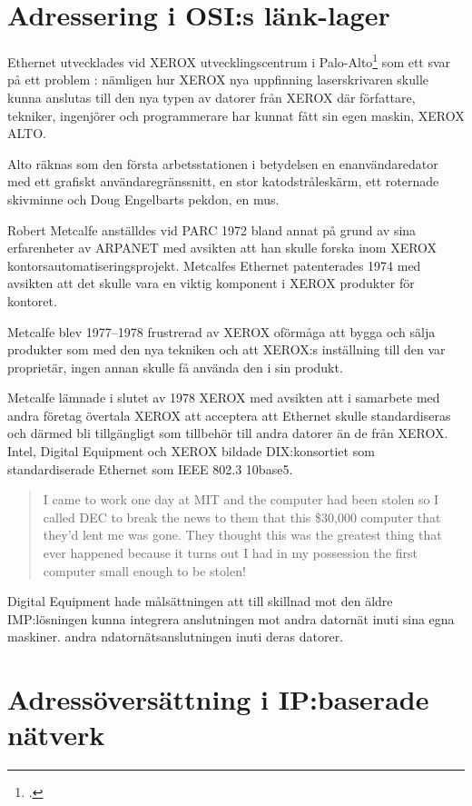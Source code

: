 \documentclass[swedish,10pt,a4paper]{article}
\begin{document}
\section{Adressering i OSI:s länk-lager}\label{sec:adressering_i_osis_data_link_layer}

Ethernet utvecklades vid XEROX utvecklingscentrum i Palo-Alto\footcite[kapitel 1]{Spurgeon2000}
som ett svar på ett problem : nämligen hur XEROX nya uppfinning laserskrivaren
skulle kunna anslutas till den nya typen av datorer från XEROX där författare, tekniker,
ingenjörer och programmerare har kunnat fått sin egen maskin, XEROX ALTO.

Alto räknas som den första arbetsstationen i betydelsen en enanvändaredator med ett grafiskt
användaregränssnitt, en stor katodstråleskärm, ett roternade skivminne
och Doug Engelbarts pekdon, en mus.

Robert Metcalfe anställdes vid PARC 1972 bland annat på grund av sina erfarenheter av ARPANET
med avsikten att han skulle forska inom XEROX kontorsautomatiseringsprojekt.
Metcalfes Ethernet patenterades 1974 med avsikten att det skulle vara en viktig
komponent i XEROX produkter för kontoret.

Metcalfe blev 1977--1978 frustrerad av XEROX oförmåga att bygga och sälja produkter som
med den nya tekniken och att XEROX:s inställning till den var proprietär, ingen
annan skulle få använda den i sin produkt.

Metcalfe lämnade i slutet av 1978 XEROX med avsikten att i samarbete med andra
företag övertala XEROX att acceptera att Ethernet skulle standardiseras
och därmed bli tillgängligt som tillbehör till andra datorer än de från
XEROX. Intel, Digital Equipment och XEROX bildade DIX:konsortiet som
standardiserade Ethernet som IEEE 802.3 10base5.

\blockquote[\cite{Robert Metcalfe}]{I came to work one day at MIT and the computer had
  been stolen so I called DEC to break the news to them that this \$30,000
  computer that they'd lent me was gone. They thought this was the greatest thing that ever
  happened because it turns out I had in my possession the first computer small enough to be stolen!}

Digital Equipment hade målsättningen att till skillnad mot den äldre IMP:lösningen
kunna integrera anslutningen mot andra datornät inuti sina egna maskiner.
andra ndatornätsanslutningen inuti deras datorer.

\section{Adressöversättning i IP:baserade nätverk}\label{sec:address_translation}
\end{document}

